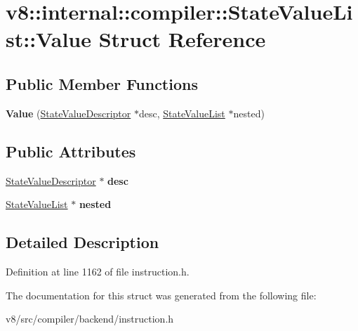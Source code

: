 \hypertarget{structv8_1_1internal_1_1compiler_1_1StateValueList_1_1Value}{}\section{v8\+:\+:internal\+:\+:compiler\+:\+:State\+Value\+List\+:\+:Value Struct Reference}
\label{structv8_1_1internal_1_1compiler_1_1StateValueList_1_1Value}
\subsection*{Public Member Functions}
\begin{DoxyCompactItemize}
\item 
\mbox{\label{structv8_1_1internal_1_1compiler_1_1StateValueList_1_1Value_aaa9cd699e6f255e57a0da75b5eb3eebb}} 
{\bfseries Value} (\mbox{\hyperlink{classv8_1_1internal_1_1compiler_1_1StateValueDescriptor}{State\+Value\+Descriptor}} $\ast$desc, \mbox{\hyperlink{classv8_1_1internal_1_1compiler_1_1StateValueList}{State\+Value\+List}} $\ast$nested)
\end{DoxyCompactItemize}
\subsection*{Public Attributes}
\begin{DoxyCompactItemize}
\item 
\mbox{\label{structv8_1_1internal_1_1compiler_1_1StateValueList_1_1Value_a69bbec3d6f687750894f7e93431a43db}} 
\mbox{\hyperlink{classv8_1_1internal_1_1compiler_1_1StateValueDescriptor}{State\+Value\+Descriptor}} $\ast$ {\bfseries desc}
\item 
\mbox{\label{structv8_1_1internal_1_1compiler_1_1StateValueList_1_1Value_a267c8b555ef5ba5974efaaac427b387f}} 
\mbox{\hyperlink{classv8_1_1internal_1_1compiler_1_1StateValueList}{State\+Value\+List}} $\ast$ {\bfseries nested}
\end{DoxyCompactItemize}


\subsection{Detailed Description}


Definition at line 1162 of file instruction.\+h.



The documentation for this struct was generated from the following file\+:\begin{DoxyCompactItemize}
\item 
v8/src/compiler/backend/instruction.\+h\end{DoxyCompactItemize}
